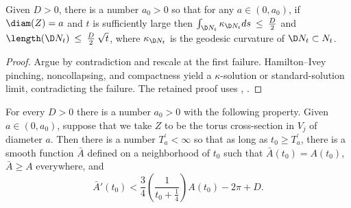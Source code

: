 \begin{lemma}
  \label{lem:kl-incompressibility-cuspidal-tori-existence-kappa-solutions}
 \label{Hamlemma}
Given $D > 0$, there is a number $a_0 > 0$
so that for any $a \in (0,a_0)$, if $\diam(Z) = a$ and $t$ is
sufficiently large then
$\int_{\D N_t}\kappa_{\D N_t}ds \: \le \: \frac{D}{2}$ and
$\length(\D N_t) \: \le \: \frac{D}{2} \: \sqrt{t}$,
where $\kappa_{\D N_t}$ is the geodesic curvature of
$\D N_t \subset N_t$.
\end{lemma}

\begin{proof}
\sketch Argue by contradiction and rescale at the first failure. Hamilton--Ivey pinching, noncollapsing, and compactness yield a $\kappa$-solution or standard-solution limit, contradicting the failure.
The retained proof uses \cite[Sections 11 and 12]{Hamiltonn}, \cite[Section 12]{Hamiltonn}.
\end{proof}

\begin{lemma}
  \label{lem:kl-incompressibility-cuspidal-tori-existence-diameter}
 \label{lemsupport}
For every $D>0$ there is a number $a_0>0$ with the following property.
Given $a \in (0, a_0)$, suppose that we take $Z$ to be the torus
cross-section
in $V_j$
of diameter $a$. Then
there is a number $T^\prime_a < \infty$ so that as long as
$t_0\geq T^\prime_a$, there is a smooth function $\bar A$ defined
on a neighborhood of $t_0$ such that $\bar  A(t_0)=A(t_0)$, $\bar A\geq A$
everywhere, and
\begin{equation} \label{dereqn}
\bar A'(t_0)< \frac{3}{4}\left(\frac{1}{t_0+\frac14}\right) A(t_0)-2\pi+D.
\end{equation}
\end{lemma}

